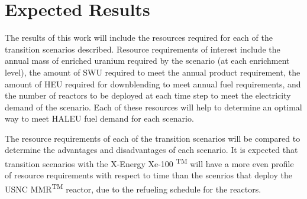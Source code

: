 \section{Expected Results}

The results of this work will include the resources required 
for each of the transition scenarios described. Resource requirements
of interest include the annual mass of enriched uranium required by 
the scenario (at each enrichment level), the amount of 
\gls{SWU} required to meet the annual product requirement, the amount 
of \gls{HEU} required for downblending to meet annual fuel requirements, 
and the number of reactors to be deployed at each time step to meet the 
electricity demand of the scenario. Each of these resources will help
to determine an optimal way to meet \gls{HALEU} fuel demand for each 
scenario. 

The resource requirements of each of the transition scenarios will 
be compared to determine the advantages and disadvantages of each 
scenario. It is expected that transition scenarios with the X-Energy 
Xe-100 \textsuperscript{TM} will have a more even profile of resource 
requirements with respect to time than the scenrios that deploy the 
\gls{USNC} \gls{MMR}\textsuperscript{TM} reactor, due to the refueling 
schedule for the reactors. 

